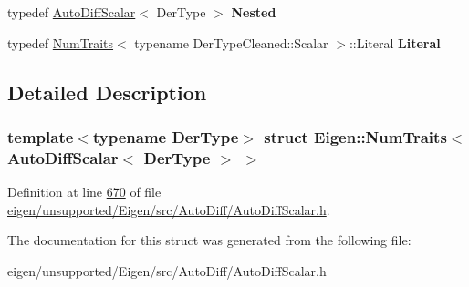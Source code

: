 \begin{DoxyCompactItemize}
typedef \hyperlink{class_eigen_1_1_auto_diff_scalar}{Auto\+Diff\+Scalar}$<$ Der\+Type $>$ {\bfseries Nested}
\item 
\mbox{\label{struct_eigen_1_1_num_traits_3_01_auto_diff_scalar_3_01_der_type_01_4_01_4_a2f014c8b9cb807dd4f8e45a1ddafd683}} 
typedef \hyperlink{group___core___module_struct_eigen_1_1_num_traits}{Num\+Traits}$<$ typename Der\+Type\+Cleaned\+::\+Scalar $>$\+::Literal {\bfseries Literal}
\end{DoxyCompactItemize}


\subsection{Detailed Description}
\subsubsection*{template$<$typename Der\+Type$>$\newline
struct Eigen\+::\+Num\+Traits$<$ Auto\+Diff\+Scalar$<$ Der\+Type $>$ $>$}



Definition at line \hyperlink{eigen_2unsupported_2_eigen_2src_2_auto_diff_2_auto_diff_scalar_8h_source_l00670}{670} of file \hyperlink{eigen_2unsupported_2_eigen_2src_2_auto_diff_2_auto_diff_scalar_8h_source}{eigen/unsupported/\+Eigen/src/\+Auto\+Diff/\+Auto\+Diff\+Scalar.\+h}.



The documentation for this struct was generated from the following file\+:\begin{DoxyCompactItemize}
\item 
eigen/unsupported/\+Eigen/src/\+Auto\+Diff/\+Auto\+Diff\+Scalar.\+h\end{DoxyCompactItemize}
